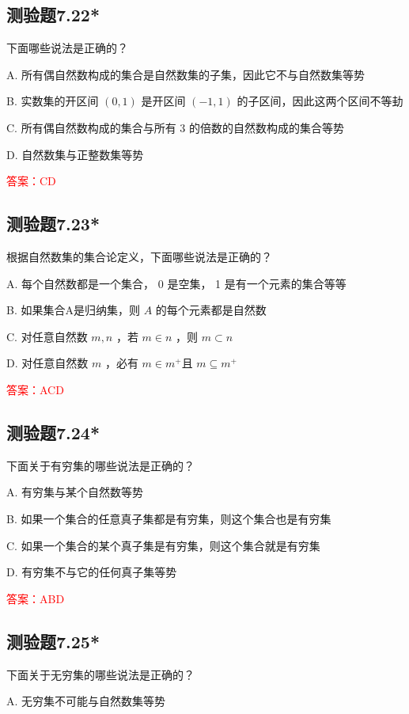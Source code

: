 \documentclass[UTF8, heading=true]{ctexart}
\begin{document}
\subsection{测验题7.22*}

下面哪些说法是正确的？

A. 所有偶自然数构成的集合是自然数集的子集，因此它不与自然数集等势

B. 实数集的开区间 $(0,1)$ 是开区间 $(-1,1)$ 的子区间，因此这两个区间不等劸

C. 所有偶自然数构成的集合与所有 3 的倍数的自然数构成的集合等势

D. 自然数集与正整数集等势

\textcolor{red}{答案：CD}

\subsection{测验题7.23*}

根据自然数集的集合论定义，下面哪些说法是正确的？

A. 
每个自然数都是一个集合， 0 是空集， 1 是有一个元素的集合等等

B. 
如果集合A是归纳集，则 $A$ 的每个元素都是自然数

C. 
对任意自然数 $m, n$ ，若 $m \in n$ ，则 $m \subset n$

D. 
对任意自然数 $m$ ，必有 $m \in m^{+}$且 $m \subseteq m^{+}$

\textcolor{red}{答案：ACD}

\subsection{测验题7.24*}

下面关于有穷集的哪些说法是正确的？

A. 有穷集与某个自然数等势

B. 如果一个集合的任意真子集都是有穷集，则这个集合也是有穷集

C. 如果一个集合的某个真子集是有穷集，则这个集合就是有穷集

D. 有穷集不与它的任何真子集等势

\textcolor{red}{答案：ABD}

\subsection{测验题7.25*}

下面关于无穷集的哪些说法是正确的？

A. 无穷集不可能与自然数集等势
\end{document}
